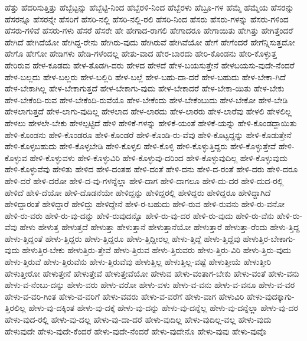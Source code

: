 {ಹೆತ್ತು
ಹೆದರಿಸುತ್ತಿತ್ತು
ಹೆಬ್ಬೆಟ್ಟನ್ನು
ಹೆಬ್ಬೆಟ್ಟಿ-ನಿಂದ
ಹೆಬ್ಬೆರಳಿ-ನಿಂದ
ಹೆಬ್ಬೆರಳು
ಹೆಬ್ರೂ-ಗಳ
ಹೆಮ್ಮೆ
ಹೆಮ್ಮೆಯ
ಹೆಸರನ್ನು
ಹೆಸರನ್ನೂ
ಹೆಸರನ್ನೇ
ಹೆಸರಿಗೆ
ಹೆಸರಿ-ನಲ್ಲಿ
ಹೆಸರಿ-ನಲ್ಲಿ-ರಲಿ
ಹೆಸರಿ-ನಿಂದ
ಹೆಸರು
ಹೆಸರು-ಗಳನ್ನು
ಹೆಸರು-ಗಳಿಂದ
ಹೆಸರು-ಗಳಿವೆ
ಹೆಸರು-ಗಳು
ಹೆಸರೆ
ಹೆಸರೇ
ಹೇ
ಹೇಗಾದ-ರಾಗಲಿ
ಹೇಗಾದರೂ
ಹೇಗಾಯಿತು
ಹೇಗಿತ್ತು
ಹೇಗಿತ್ತೆಂದರೆ
ಹೇಗಿದೆ
ಹೇಗಿದೆಯೋ
ಹೇಗಿದ್ದ-ರೇನು
ಹೇಗಿರು-ವುದು
ಹೇಗಿರುವೆ
ಹೇಗಿವೆಯೋ
ಹೇಗೆ
ಹೇಗೆಂದರೆ
ಹೇಗೆನ್ನಿಸುತ್ತದೋ
ಹೇಗೊ
ಹೇಗೋ
ಹೇಡಿಗಳು
ಹೇಡಿ-ಗಳೆಂದಲ್ಲ
ಹೇತು-ವಾದ
ಹೇರ-ಬಾರದು
ಹೇರಿ-ಕೊಂಡನು
ಹೇರಿ-ಕೊಳ್ಳುತ್ತ
ಹೇರಿರುವ
ಹೇಳ-ಕೂಡದು
ಹೇಳ-ತೊಡಗಿ-ದರು
ಹೇಳದ
ಹೇಳದೆ
ಹೇಳ-ಬಯಸುತ್ತೇನೆ
ಹೇಳಬಯಸು-ವುದೇ-ನೆಂದರೆ
ಹೇಳ-ಬಲ್ಲದು
ಹೇಳ-ಬಲ್ಲರು
ಹೇಳ-ಬಲ್ಲಿರಿ
ಹೇಳ-ಬಲ್ಲೆ
ಹೇಳ-ಬಹು-ದಾ-ದರೆ
ಹೇಳ-ಬಹುದು
ಹೇಳ-ಬೇಕಾ-ಗಿದೆ
ಹೇಳ-ಬೇಕಾಗಿಲ್ಲ
ಹೇಳ-ಬೇಕಾಗುತ್ತದೆ
ಹೇಳ-ಬೇಕಾಗು-ವುದು
ಹೇಳ-ಬೇಕಾದರೆ
ಹೇಳ-ಬೇಕಾ-ಯಿತು
ಹೇಳ-ಬೇಕು
ಹೇಳ-ಬೇಕೆಂದಿ-ರುವ
ಹೇಳ-ಬೇಕೆಂದಿ-ರುವೆಯೊ
ಹೇಳ-ಬೇಕೆಂದು
ಹೇಳ-ಬೇಕೆಂಬುದು
ಹೇಳ-ಬೇಕೋ
ಹೇಳ-ಬೇಡಿ
ಹೇಳಲಾಗುತ್ತದೆ
ಹೇಳ-ಲಾಗು-ವುದಿಲ್ಲ
ಹೇಳಲಾದ
ಹೇಳ-ಲಾರದು
ಹೇಳ-ಲಾರರು
ಹೇಳ-ಲಾರೆವು
ಹೇಳಲಿ
ಹೇಳಲಿಲ್ಲ
ಹೇಳಲು
ಹೇಳಲೇ-ಬೇಕು
ಹೇಳಲ್ಪಟ್ಟಿದೆ
ಹೇಳಿ
ಹೇಳಿಕೆ-ಗಳನ್ನು
ಹೇಳಿಕೆ-ಯಂತೆ
ಹೇಳಿಕೆ-ಯನ್ನು
ಹೇಳಿ-ಕೊಂಡದ್ದಾಯಿತು
ಹೇಳಿ-ಕೊಂಡನು
ಹೇಳಿ-ಕೊಂಡರೂ
ಹೇಳಿ-ಕೊಂಡರೆ
ಹೇಳಿ-ಕೊಂಡಿ-ರು-ವೆವು
ಹೇಳಿ-ಕೊಟ್ಟದ್ದನ್ನು
ಹೇಳಿ-ಕೊಡುತ್ತೇನೆ
ಹೇಳಿ-ಕೊಳ್ಳಬಹುದು
ಹೇಳಿ-ಕೊಳ್ಳಬೇಡಿ
ಹೇಳಿ-ಕೊಳ್ಳಲಿ
ಹೇಳಿ-ಕೊಳ್ಳಿ
ಹೇಳಿ-ಕೊಳ್ಳುತ್ತಿದ್ದರು
ಹೇಳಿ-ಕೊಳ್ಳುತ್ತೇವೆ
ಹೇಳಿ-ಕೊಳ್ಳುವ
ಹೇಳಿ-ಕೊಳ್ಳುವಳು
ಹೇಳಿ-ಕೊಳ್ಳುವಿರಿ
ಹೇಳಿ-ಕೊಳ್ಳುವು-ದರಿಂದ
ಹೇಳಿ-ಕೊಳ್ಳುವುದಿಲ್ಲ
ಹೇಳಿ-ಕೊಳ್ಳುವುದು
ಹೇಳಿ-ಕೊಳ್ಳುವೆವು
ಹೇಳಿತು
ಹೇಳಿದ
ಹೇಳಿ-ದಂತಹ
ಹೇಳಿ-ದಂತೆ
ಹೇಳಿ-ದನು
ಹೇಳಿ-ದ-ರಂತೆ
ಹೇಳಿ-ದರು
ಹೇಳಿ-ದರೂ
ಹೇಳಿ-ದರೆ
ಹೇಳಿ-ದರೋ
ಹೇಳಿ-ದ-ವು-ಗಳನ್ನೆಲ್ಲಾ
ಹೇಳಿ-ದಾಗ
ಹೇಳಿ-ದಾಗಲೂ
ಹೇಳಿ-ದು-ದರ
ಹೇಳಿ-ದುದ-ರಲ್ಲಿ
ಹೇಳಿದೆ
ಹೇಳಿ-ದೆಯೋ
ಹೇಳಿ-ದೊಡನೆಯೇ
ಹೇಳಿದ್ದನ್ನು
ಹೇಳಿದ್ದರಲ್ಲಿ
ಹೇಳಿದ್ದರು
ಹೇಳಿದ್ದರೂ
ಹೇಳಿದ್ದಾಗಿದೆ
ಹೇಳಿದ್ದಾರಂತೆ
ಹೇಳಿದ್ದಾರೆ
ಹೇಳಿದ್ದು
ಹೇಳಿದ್ದೇನೆ
ಹೇಳಿ-ರ-ಬಹುದು
ಹೇಳಿ-ರುವ
ಹೇಳಿ-ರುವನು
ಹೇಳಿ-ರು-ವನೋ
ಹೇಳಿ-ರು-ವರು
ಹೇಳಿ-ರು-ವು-ದನ್ನು
ಹೇಳಿ-ರುವುದನ್ನೊ
ಹೇಳಿ-ರು-ವು-ದರ
ಹೇಳಿ-ರು-ವುದು
ಹೇಳಿ-ರು-ವೆನು
ಹೇಳಿ-ರು-ವೆವು
ಹೇಳು
ಹೇಳುತ್ತ
ಹೇಳುತ್ತದೆ
ಹೇಳುತ್ತಾ
ಹೇಳುತ್ತಾನೆ
ಹೇಳುತ್ತಾನೆಯೋ
ಹೇಳುತ್ತಾರೆ
ಹೇಳುತ್ತಾ-ರೆಂದು
ಹೇಳು-ತ್ತಿದ್ದ
ಹೇಳು-ತ್ತಿದ್ದಂತೆ
ಹೇಳು-ತ್ತಿದ್ದರು
ಹೇಳು-ತ್ತಿದ್ದರೂ
ಹೇಳು-ತ್ತಿದ್ದೀರಲ್ಲ
ಹೇಳು-ತ್ತಿದ್ದೆ
ಹೇಳು-ತ್ತಿದ್ದೆವು
ಹೇಳುತ್ತಿರ-ಬೇಕಾಗು-ವುದು
ಹೇಳುತ್ತಿರ-ಬೇಕು
ಹೇಳುತ್ತಿರು-ತ್ತೇವೆ
ಹೇಳು-ತ್ತಿರುವ
ಹೇಳು-ತ್ತಿರುವರು
ಹೇಳು-ತ್ತಿರು-ವಿರಿ
ಹೇಳು-ತ್ತಿರು-ವುದು
ಹೇಳು-ತ್ತಿರುವೆ
ಹೇಳು-ತ್ತಿರುವೆನು
ಹೇಳು-ತ್ತಿರುವೆವು
ಹೇಳುತ್ತಿಲ್ಲ
ಹೇಳುತ್ತಿಲ್ಲ-ವಷ್ಟೆ
ಹೇಳುತ್ತೀಯೆ
ಹೇಳುತ್ತೀರಿ
ಹೇಳುತ್ತೀರೋ
ಹೇಳುತ್ತೇನೆ
ಹೇಳುತ್ತೇವೆ
ಹೇಳುತ್ತೇವೆಯೋ
ಹೇಳುವ
ಹೇಳು-ವಂತಾಗ-ಬೇಕು
ಹೇಳು-ವಂತೆ
ಹೇಳು-ವನು
ಹೇಳು-ವ-ನೆಂಬು-ದನ್ನು
ಹೇಳು-ವರು
ಹೇಳು-ವರೋ
ಹೇಳು-ವಳು
ಹೇಳು-ವ-ವನು
ಹೇಳು-ವ-ವನೂ
ಹೇಳು-ವ-ವರ
ಹೇಳು-ವ-ವರಿ-ಗಿಂತ
ಹೇಳು-ವ-ವರಿಗೆ
ಹೇಳು-ವವರು
ಹೇಳು-ವ-ವರೆಗೆ
ಹೇಳು-ವಾಗ
ಹೇಳುವಿರಿ
ಹೇಳು-ವುದಕ್ಕಾಗು-ತ್ತಿರಲಿಲ್ಲ
ಹೇಳು-ವು-ದಕ್ಕಿಂತ
ಹೇಳು-ವು-ದಕ್ಕೆ
ಹೇಳು-ವು-ದನ್ನು
ಹೇಳು-ವು-ದನ್ನೆಲ್ಲ
ಹೇಳು-ವು-ದನ್ನೆಲ್ಲಾ
ಹೇಳು-ವು-ದರ
ಹೇಳು-ವುದ-ರಲ್ಲಿ
ಹೇಳು-ವು-ದಲ್ಲ
ಹೇಳು-ವು-ದಾ-ದರೆ
ಹೇಳು-ವುದಿಲ್ಲ
ಹೇಳು-ವುದಿಲ್ಲ-ವಲ್ಲ
ಹೇಳು-ವುದು
ಹೇಳುವುದೇ
ಹೇಳು-ವುದೇ-ಕೆಂದರೆ
ಹೇಳು-ವುದೇ-ನೆಂದರೆ
ಹೇಳು-ವುದೇನೊ
ಹೇಳು-ವುವು
ಹೇಳು-ವುವೊ
}
